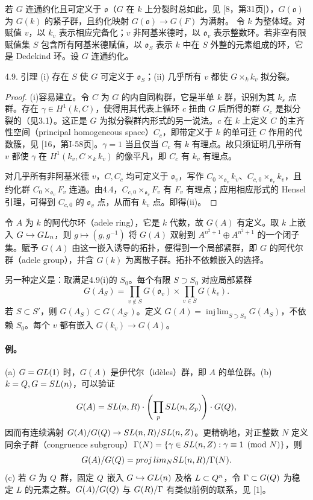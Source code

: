 若 $G$ 连通约化且可定义于 $\mathfrak o$（$G$ 在 $k$ 上分裂时总如此，见 [8，第31页]），$G(\mathfrak o)$ 为 $G(k)$ 的紧子群，且约化映射 $G(\mathfrak o)\to G(F)$ 为满射。
令 $k$ 为整体域。对赋值 $v$，以 $k_v$ 表示相应完备化；$v$ 非阿基米德时，以 $\mathfrak o_v$ 表示整数环。若非空有限赋值集 $S$ 包含所有阿基米德赋值，以 $\mathfrak o_S$ 表示 $k$ 中在 $S$ 外整的元素组成的环，它是 Dedekind 环。设 $G$ 连通约化。
\begin{originaltheorem}{4.9. 引理}
(i) 存在 $S$ 使 $G$ 可定义于 $\mathfrak o_S$；(ii) 几乎所有 $v$ 都使 $G\times_kk_v$ 拟分裂。
\end{originaltheorem}
\begin{proof}
(i)容易建立。令 $C$ 为 $G$ 的内自同构群，它是半单 $k$ 群，识别为其 $k_s$ 点群。存在 $\gamma\in H^1(k,C)$，使得用其代表上循环 $c$ 扭曲 $G$ 后所得的群 $G_c$ 是拟分裂的（见3.1）。这正是 $G$ 为拟分裂群内形式的另一说法。$c$ 在 $k$ 上定义 $C$ 的主齐性空间（principal homogeneous space）$C_c$，即带定义于 $k$ 的单可迁 $C$ 作用的代数簇，见 [16，第I-58页]。$\gamma=1$ 当且仅当 $C_c$ 有 $k$ 有理点。故只须证明几乎所有 $v$ 都使 $\gamma$ 在 $H^1(k_v,C\times_kk_v)$ 的像平凡，即 $C_c$ 有 $k_v$ 有理点。

对几乎所有非阿基米德 $v$，$C,C_c$ 均可定义于 $\mathfrak o_v$，写作 $C_0\times_{\mathfrak o_v}k_v$、$C_{c,0}\times_{\mathfrak o_v}k_v$，且约化群 $C_0\times_{\mathfrak o_v}F_v$ 连通。由4.4，$C_{c,0}\times_{\mathfrak o_v}F_v$ 有 $F_v$ 有理点；应用相应形式的 Hensel 引理，可得到 $C_{c,0}$ 的 $\mathfrak o_v$ 点，从而有 $k_v$ 点。即得(ii)。
\end{proof}
令 $A$ 为 $k$ 的阿代尔环（adele ring），它是 $k$ 代数，故 $G(A)$ 有定义。取 $k$ 上嵌入 $G\hookrightarrow GL_n$，则 $g\mapsto(g,g^{-1})$ 将 $G(A)$ 双射到 $A^{n^2+1}\oplus A^{n^2+1}$ 的一个闭子集。赋予 $G(A)$ 由这一嵌入诱导的拓扑，便得到一个局部紧群，即 $G$ 的阿代尔群（adele group），并含 $G(k)$ 为离散子群。拓扑不依赖嵌入的选择。

另一种定义是：取满足4.9(i)的 $S_0$。每个有限 $S\supset S_0$ 对应局部紧群
\[
 G(A_S)=\prod_{v\notin S}G(\mathfrak o_v)\times\prod_{v\in S}G(k_v).
\]
若 $S\subset S'$，则 $G(A_S)\subset G(A_{S'})$。定义 $G(A)=\operatorname{inj\,lim}_{S\supset S_0}G(A_S)$，不依赖 $S_0$。每个 $v$ 都有嵌入 $G(k_v)\to G(A)$。

\paragraph*{例。} (a) $G=GL(1)$ 时，$G(A)$ 是伊代尔（idèles）群，即 $A$ 的单位群。(b) $k=Q,G=SL(n)$，可以验证
\[
 G(A)=SL(n,R)\cdot\left(\prod_pSL(n,Z_p)\right)\cdot G(Q),
\]
因而有连续满射 $G(A)/G(Q)\to SL(n,R)/SL(n,Z)$。更精确地，对正整数 $N$ 定义同余子群（congruence subgroup）$\Gamma(N)=\{\gamma\in SL(n,Z):\gamma\equiv1\pmod N\}$，则
\[
 G(A)/G(Q)=proj\,lim_NSL(n,R)/\Gamma(N).
\]
(c) 若 $G$ 为 $Q$ 群，固定 $Q$ 嵌入 $G\hookrightarrow GL(n)$ 及格 $L\subset Q^n$，令 $\Gamma\subset G(Q)$ 为稳定 $L$ 的元素之群。$G(A)/G(Q)$ 与 $G(R)/\Gamma$ 有类似前例的联系，见 [1]。

